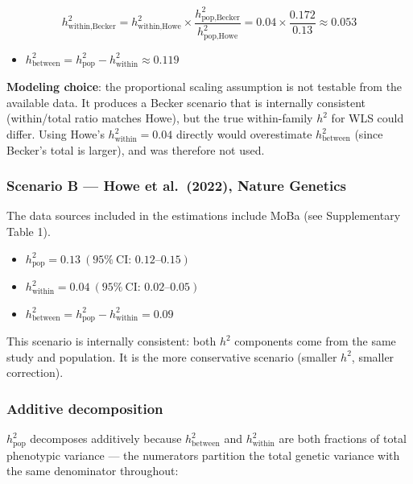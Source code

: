 \documentclass[
]{article}
\providecommand{\tightlist}{%
  \setlength{\itemsep}{0pt}\setlength{\parskip}{0pt}}
\begin{document}
\[h^2_{\text{within},\text{Becker}} = h^2_{\text{within},\text{Howe}} \times \frac{h^2_{\text{pop},\text{Becker}}}{h^2_{\text{pop},\text{Howe}}} = 0.04 \times \frac{0.172}{0.13} \approx 0.053\]

\begin{itemize}
\tightlist
\item
  \(h^2_\text{between} = h^2_\text{pop} - h^2_\text{within} \approx 0.119\)
\end{itemize}

\textbf{Modeling choice}: the proportional scaling assumption is not
testable from the available data. It produces a Becker scenario that is
internally consistent (within/total ratio matches Howe), but the true
within-family \(h^2\) for WLS could differ. Using Howe's
\(h^2_\text{within} = 0.04\) directly would overestimate
\(h^2_\text{between}\) (since Becker's total is larger), and was
therefore not used.

\subsubsection{Scenario B --- Howe et al.~(2022), Nature
Genetics}

The data sources included in the estimations include MoBa (see
Supplementary Table 1).

\begin{itemize}
\tightlist
\item
  \(h^2_\text{pop} = 0.13\ (95\%\ \text{CI: } 0.12\text{–}0.15)\)
\item
  \(h^2_\text{within} = 0.04\ (95\%\ \text{CI: } 0.02\text{–}0.05)\)
\item
  \(h^2_\text{between} = h^2_\text{pop} - h^2_\text{within} = 0.09\)
\end{itemize}

This scenario is internally consistent: both \(h^2\) components come
from the same study and population. It is the more conservative scenario
(smaller \(h^2\), smaller correction).

\subsubsection{Additive decomposition}

\(h^2_\text{pop}\) decomposes additively because \(h^2_\text{between}\)
and \(h^2_\text{within}\) are both fractions of total phenotypic
variance --- the numerators partition the total genetic variance with
the same denominator throughout:
\end{document}
